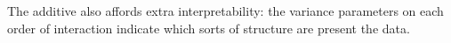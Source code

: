 The additive \gp{} also affords extra interpretability: the variance parameters on each order of interaction indicate which sorts of structure are present the data.




\outbpdocument{


}







%
%





 
 

